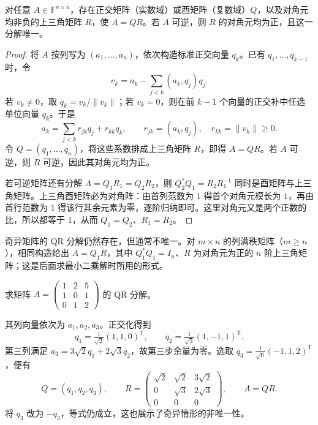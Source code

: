 \begin{theorem}[QR 分解]
\label{thm:qr-decomposition}
对任意 $A\in\mathbb F^{n\times n}$，存在正交矩阵（实数域）或酉矩阵（复数域）$Q$，以及对角元均非负的上三角矩阵 $R$，使 $A=QR$。若 $A$ 可逆，则 $R$ 的对角元均为正，且这一分解唯一。
\end{theorem}
\begin{proof}
将 $A$ 按列写为 $(a_1,\ldots,a_n)$，依次构造标准正交向量 $q_k$。已有 $q_1,\ldots,q_{k-1}$ 时，令
\[
    v_k=a_k-\sum_{j<k}(a_k,q_j)q_j.
\]
若 $v_k\ne0$，取 $q_k=v_k/\|v_k\|$；若 $v_k=0$，则在前 $k-1$ 个向量的正交补中任选单位向量 $q_k$。于是
\[
    a_k=\sum_{j<k}r_{jk}q_j+r_{kk}q_k,
    \qquad r_{jk}=(a_k,q_j),\quad r_{kk}=\|v_k\|\geq0.
\]
令 $Q=(q_1,\ldots,q_n)$，将这些系数排成上三角矩阵 $R$，即得 $A=QR$。若 $A$ 可逆，则 $R$ 可逆，因此其对角元均为正。

若可逆矩阵还有分解 $A=Q_1R_1=Q_2R_2$，则 $Q_2^*Q_1=R_2R_1^{-1}$ 同时是酉矩阵与上三角矩阵。上三角酉矩阵必为对角阵：由首列范数为 $1$ 得首个对角元模长为 $1$，再由首行范数为 $1$ 得该行其余元素为零，逐阶归纳即可。这里对角元又是两个正数的比，所以都等于 $1$，从而 $Q_1=Q_2$、$R_1=R_2$。
\end{proof}

奇异矩阵的 QR 分解仍然存在，但通常不唯一。对 $m\times n$ 的列满秩矩阵（$m\geq n$），相同构造给出 $A=Q_1R$，其中 $Q_1^*Q_1=I_n$、$R$ 为对角元为正的 $n$ 阶上三角矩阵；这是后面求最小二乘解时所用的形式。

\begin{example}
\label{ex:qr-rank-deficient}
求矩阵 $A=\begin{pmatrix}1&2&5\\1&0&1\\0&1&2\end{pmatrix}$ 的 QR 分解。
\end{example}
\begin{solve}
其列向量依次为 $a_1,a_2,a_3$。正交化得到
\[
    q_1=\tfrac1{\sqrt2}(1,1,0)^{\mathsf T},\qquad
    q_2=\tfrac1{\sqrt3}(1,-1,1)^{\mathsf T}.
\]
第三列满足 $a_3=3\sqrt2q_1+2\sqrt3q_2$，故第三步余量为零。选取 $q_3=\tfrac1{\sqrt6}(-1,1,2)^{\mathsf T}$，便有
\[
    Q=(q_1,q_2,q_3),\qquad
    R=\begin{pmatrix}\sqrt2&\sqrt2&3\sqrt2\\
    0&\sqrt3&2\sqrt3\\0&0&0\end{pmatrix},\qquad A=QR.
\]
将 $q_3$ 改为 $-q_3$，等式仍成立，这也展示了奇异情形的非唯一性。
\end{solve}


